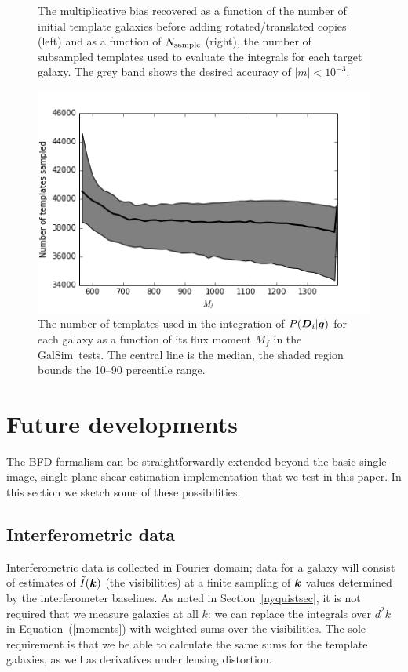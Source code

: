 \documentclass[11pt,preprint,flushrt]{aastex}
\def\eqq#1{Equation~(\ref{#1})}
\newcommand{\vecD}{\mbox{\boldmath $D$}}
\newcommand{\vecg}{\mbox{\boldmath $g$}}
\newcommand{\veck}{\mbox{\boldmath $k$}}
\newcommand{\galsim}{{\sc GalSim}}
\begin{document}
\begin{figure}[ht]
\caption{ The multiplicative bias recovered as a function of the number of
  initial template galaxies before adding rotated/translated copies (left) and as a function
  of $N_{\rm sample}$ (right), the number of subsampled templates used to
  evaluate the integrals for each target galaxy.
  The grey band shows the desired accuracy of $|m|<10^{-3}$.
}
\label{template_n}
\end{figure}

\begin{figure}[htb]
\centering
\includegraphics[width=0.5\linewidth]{ntemp_Mflux.png}
\caption{ The number of templates used in the integration of
  $P(\vecD_i|\vecg)$ for each galaxy as a function of its flux moment
  $M_f$ in the \galsim\ tests.  The central line is the median,
  the shaded region bounds the 10--90 percentile range.}
\label{ntemp}
\end{figure}


\section{Future developments}
\label{extensions}
The BFD formalism can be straightforwardly extended beyond the basic
single-image, single-plane shear-estimation implementation that we
test in this paper.  In this section we sketch some of these
possibilities.

\subsection{Interferometric data}
\label{interferometry}
Interferometric data is collected in Fourier domain; data for a galaxy
will consist of estimates of $\tilde I(\veck)$ (the visibilities) at a
finite sampling of $\veck$ values determined by the interferometer
baselines.  As noted in Section~\ref{nyquistsec}, it is not required
that we measure galaxies at all \veck: we can
replace the integrals over $d^2k$ in \eqq{moments} with
weighted sums over the
visibilities.  The sole requirement is that we be able to calculate
the same sums for the template galaxies, as well as derivatives under
lensing distortion.   
\end{document}
